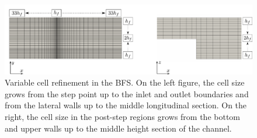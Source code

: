 \documentclass[final,3p,times,11pt,onecolumn]{myElsarticle}
\numberwithin{equation}{section}
\begin{document}
\begin{figure}[b!!!]
\centering
\includegraphics[width=16cm]{fig/Cases/Factores.pdf}
\caption{Variable cell refinement in the BFS.  On the left figure, the cell size grows from the step point up to the inlet and outlet boundaries and from the lateral walls up to the middle longitudinal section. On the right, the cell size in the post-step regions grows from the bottom and upper walls up to the middle height section of the channel.}
\label{Fig:Factores}
\end{figure}
\end{document}
